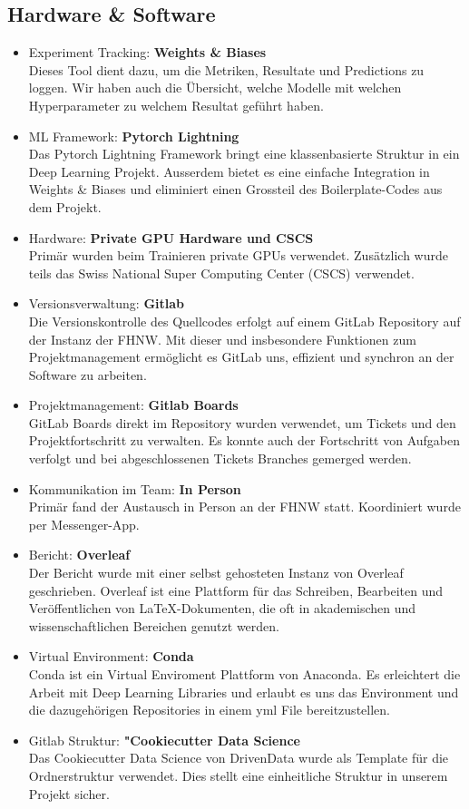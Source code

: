 \documentclass{article}
\begin{document}
\subsection{Hardware \& Software}

\begin{itemize}
 \item Experiment Tracking: \textbf{Weights \& Biases}\\
 Dieses Tool dient dazu, um die Metriken, Resultate und Predictions zu loggen. Wir haben auch die Übersicht, welche Modelle mit welchen Hyperparameter zu welchem Resultat geführt haben.
 \item ML Framework: \textbf{Pytorch Lightning}\\
 Das Pytorch Lightning Framework bringt eine klassenbasierte Struktur in ein Deep Learning Projekt. Ausserdem bietet es eine einfache Integration in Weights \& Biases und eliminiert einen Grossteil des Boilerplate-Codes aus dem Projekt.
 \item Hardware: \textbf{Private GPU Hardware und CSCS}\\
 Primär wurden beim Trainieren private GPUs verwendet. Zusätzlich wurde teils das Swiss National Super Computing Center (CSCS) verwendet.
 \item Versionsverwaltung: \textbf{Gitlab}\\
 Die Versionskontrolle des Quellcodes erfolgt auf einem GitLab Repository auf der Instanz der FHNW. Mit dieser und insbesondere Funktionen zum Projektmanagement  ermöglicht es GitLab uns, effizient und synchron an der Software zu arbeiten.
 \item Projektmanagement: \textbf{Gitlab Boards}\\
 GitLab Boards direkt im Repository wurden verwendet, um Tickets und den Projektfortschritt zu verwalten. Es konnte auch der Fortschritt von Aufgaben verfolgt und bei abgeschlossenen Tickets Branches gemerged werden.
 \item Kommunikation im Team: \textbf{In Person}\\
 Primär fand der Austausch in Person an der FHNW statt. Koordiniert wurde per Messenger-App.
 \item Bericht: \textbf{Overleaf}\\
 Der Bericht wurde mit einer selbst gehosteten Instanz von Overleaf geschrieben. Overleaf ist eine Plattform für das Schreiben, Bearbeiten und Veröffentlichen von LaTeX-Dokumenten, die oft in akademischen und wissenschaftlichen Bereichen genutzt werden. 
 \item Virtual Environment: \textbf{Conda}\\
 Conda ist ein Virtual Enviroment Plattform von Anaconda. Es erleichtert die Arbeit mit Deep Learning Libraries und erlaubt es uns das Environment und die dazugehörigen Repositories in einem yml File bereitzustellen.
 \item Gitlab Struktur: \textbf{"Cookiecutter Data Science}\\
 Das Cookiecutter Data Science von DrivenData wurde als Template für die Ordnerstruktur verwendet. Dies stellt eine einheitliche Struktur in unserem Projekt sicher.

\end{itemize}
\end{document}
